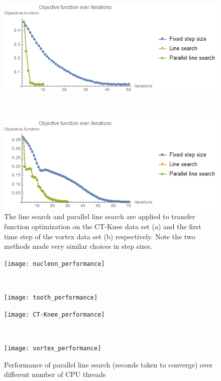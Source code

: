 \begin{figure}
	\centering
	\begin{minipage}{.49\textwidth}
		\includegraphics[width=1\linewidth]{images/CT-Knee_naive_rms_fixed_linesearch_parallel}
		\subcaption{}
	\end{minipage}~
	\begin{minipage}{.49\textwidth}
		\includegraphics[width=1\linewidth]{images/vortex_naive_rms_fixed_linesearch_parallel}
		\subcaption{}
	\end{minipage}
	\caption[The line search and parallel line search are applied to transfer function optimization on the CT-Knee data set and the first time step of the vortex data set respectively.]{The line search and parallel line search are applied to transfer function optimization on the CT-Knee data set (a) and the first time step of the vortex data set (b) respectively. Note the two methods made very similar choices in step sizes.}
	\label{fig:CT-Knee_naive_vortex_naive_rms_linesearch}
\end{figure}

\begin{figure}
	\centering
	\begin{minipage}{.49\textwidth}
		\texttt{[image: nucleon\_performance]}
	\end{minipage}~
	\begin{minipage}{.49\textwidth}
		\texttt{[image: tooth\_performance]}
	\end{minipage}
	\begin{minipage}{.49\textwidth}
		\texttt{[image: CT-Knee\_performance]}
	\end{minipage}~
	\begin{minipage}{.49\textwidth}
		\texttt{[image: vortex\_performance]}
	\end{minipage}
	\caption[Performance of parallel line search]{Performance of parallel line search (seconds taken to converge) over different number of CPU threads}
	\label{fig:parallelsearch_performance}
\end{figure}

